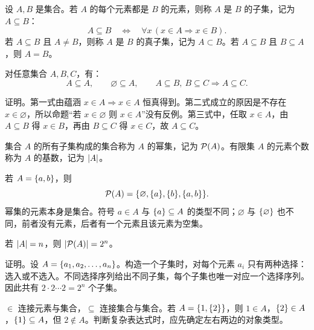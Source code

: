 \begin{definition}[子集、真子集与集合相等]\label{ch1-subset}
设 $A,B$ 是集合。若 $A$ 的每个元素都是 $B$ 的元素，则称 $A$ 是 $B$ 的子集，记为 $A\subseteq B$：
\[
  A\subseteq B \quad\Longleftrightarrow\quad \forall x\,(x\in A\Rightarrow x\in B).
\]
若 $A\subseteq B$ 且 $A\ne B$，则称 $A$ 是 $B$ 的真子集，记为 $A\subset B$。若 $A\subseteq B$ 且 $B\subseteq A$，则 $A=B$。
\end{definition}

\begin{theorem}[包含关系的基本性质]\label{ch1-subset-laws}
对任意集合 $A,B,C$，有：
\[
  A\subseteq A,\qquad
  \varnothing\subseteq A,\qquad
  A\subseteq B,\ B\subseteq C \Rightarrow A\subseteq C.
\]
\end{theorem}

证明。第一式由蕴涵 $x\in A\Rightarrow x\in A$ 恒真得到。第二式成立的原因是不存在 $x\in\varnothing$，所以命题“若 $x\in\varnothing$ 则 $x\in A$”没有反例。第三式中，任取 $x\in A$，由 $A\subseteq B$ 得 $x\in B$，再由 $B\subseteq C$ 得 $x\in C$，故 $A\subseteq C$。

\begin{definition}[幂集与基数]\label{ch1-power-cardinality}
集合 $A$ 的所有子集构成的集合称为 $A$ 的幂集，记为 $\mathcal P(A)$。有限集 $A$ 的元素个数称为 $A$ 的基数，记为 $\lvert A\rvert$。
\end{definition}

若 $A=\{a,b\}$，则
\[
  \mathcal P(A)=\{\varnothing,\{a\},\{b\},\{a,b\}\}.
\]
幂集的元素本身是集合。符号 $a\in A$ 与 $\{a\}\subseteq A$ 的类型不同；$\varnothing$ 与 $\{\varnothing\}$ 也不同，前者没有元素，后者有一个元素且该元素为空集。

\begin{theorem}[有限集幂集的基数]\label{ch1-power-cardinality-theorem}
若 $\lvert A\rvert=n$，则 $\lvert\mathcal P(A)\rvert=2^n$。
\end{theorem}

证明。设 $A=\{a_1,a_2,\ldots,a_n\}$。构造一个子集时，对每个元素 $a_i$ 只有两种选择：选入或不选入。不同选择序列给出不同子集，每个子集也唯一对应一个选择序列。因此共有 $2\cdot2\cdots2=2^n$ 个子集。

\begin{pitfall}[元素属于与子集包含]\label{ch1-in-subset}
$\in$ 连接元素与集合，$\subseteq$ 连接集合与集合。若 $A=\{1,\{2\}\}$，则 $1\in A$，$\{2\}\in A$，$\{1\}\subseteq A$，但 $2\notin A$。判断复杂表达式时，应先确定左右两边的对象类型。
\end{pitfall}

